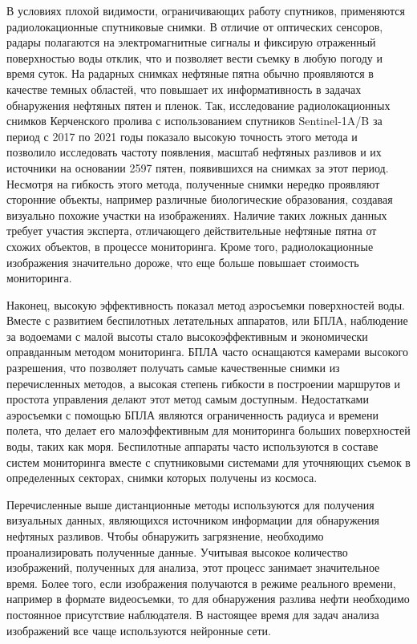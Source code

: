 В условиях плохой видимости, ограничивающих работу спутников, применяются радиолокационные спутниковые снимки. В отличие от оптических сенсоров, радары полагаются на электромагнитные сигналы и фиксирую отраженный поверхностью воды отклик, что и позволяет вести съемку в любую погоду и время суток. На радарных снимках нефтяные пятна обычно проявляются в качестве темных областей, что повышает их информативность в задачах обнаружения нефтяных пятен и пленок.  Так, исследование радиолокационных снимков Керченского пролива с использованием спутников Sentinel-1A/B за период с 2017 по 2021 годы показало высокую точность этого метода и позволило исследовать частоту появления, масштаб нефтяных разливов и их источники на основании 2597 пятен, появившихся на снимках за этот период\cite{radiophoto}. Несмотря на гибкость этого метода, полученные снимки нередко проявляют сторонние объекты, например различные биологические образования, создавая визуально похожие участки на изображениях. Наличие таких ложных данных требует участия эксперта, отличающего действительные нефтяные пятна от схожих объектов, в процессе мониторинга. Кроме того, радиолокационные изображения значительно дороже, что еще больше повышает стоимость мониторинга.

Наконец, высокую эффективность показал метод аэросъемки поверхностей воды. Вместе с развитием беспилотных летательных аппаратов, или БПЛА, наблюдение за водоемами с малой высоты стало высокоэффективным и экономически оправданным методом мониторинга. БПЛА часто оснащаются камерами высокого разрешения, что позволяет получать самые качественные снимки из перечисленных методов, а высокая степень гибкости в построении маршрутов и простота управления делают этот метод самым доступным. Недостатками аэросъемки с помощью БПЛА являются ограниченность радиуса и времени полета, что делает его малоэффективным для мониторинга больших поверхностей воды, таких как моря. Беспилотные аппараты часто используются в составе систем мониторинга вместе с спутниковыми системами для уточняющих съемок в определенных секторах, снимки которых получены из космоса. 

Перечисленные выше дистанционные методы используются для получения визуальных данных, являющихся источником информации для обнаружения нефтяных разливов. Чтобы обнаружить загрязнение, необходимо проанализировать полученные данные. Учитывая высокое количество изображений, полученных для анализа, этот процесс занимает значительное время. Более того, если изображения получаются в режиме реального времени, например в формате видеосъемки, то для обнаружения разлива нефти необходимо постоянное присутствие наблюдателя. В настоящее время для задач анализа изображений все чаще используются нейронные сети.

